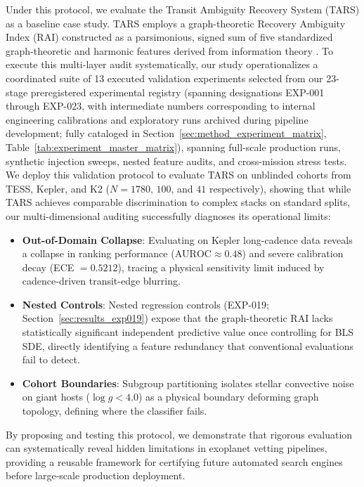 Under this protocol, we evaluate the Transit Ambiguity Recovery System (TARS) as a baseline case study. TARS employs a graph-theoretic Recovery Ambiguity Index (RAI) constructed as a parsimonious, signed sum of five standardized graph-theoretic and harmonic features derived from information theory \citep{Shannon1948, Cover2006}. To execute this multi-layer audit systematically, our study operationalizes a coordinated suite of 13 executed validation experiments selected from our 23-stage preregistered experimental registry (spanning designations EXP-001 through EXP-023, with intermediate numbers corresponding to internal engineering calibrations and exploratory runs archived during pipeline development; fully cataloged in Section~\ref{sec:method_experiment_matrix}, Table~\ref{tab:experiment_master_matrix}), spanning full-scale production runs, synthetic injection sweeps, nested feature audits, and cross-mission stress tests. We deploy this validation protocol to evaluate TARS on unblinded cohorts from TESS, Kepler, and K2 ($N=1780$, $100$, and $41$ respectively), showing that while TARS achieves comparable discrimination to complex stacks on standard splits, our multi-dimensional auditing successfully diagnoses its operational limits:
\begin{itemize}
    \item \textbf{Out-of-Domain Collapse}: Evaluating on Kepler long-cadence data reveals a collapse in ranking performance ($\text{AUROC} \approx 0.48$) and severe calibration decay (ECE $= 0.5212$), tracing a physical sensitivity limit induced by cadence-driven transit-edge blurring.
    \item \textbf{Nested Controls}: Nested regression controls (EXP-019; Section~\ref{sec:results_exp019}) expose that the graph-theoretic RAI lacks statistically significant independent predictive value once controlling for BLS SDE, directly identifying a feature redundancy that conventional evaluations fail to detect.
    \item \textbf{Cohort Boundaries}: Subgroup partitioning isolates stellar convective noise on giant hosts ($\log g < 4.0$) as a physical boundary deforming graph topology, defining where the classifier fails.
\end{itemize}

By proposing and testing this protocol, we demonstrate that rigorous evaluation can systematically reveal hidden limitations in exoplanet vetting pipelines, providing a reusable framework for certifying future automated search engines before large-scale production deployment.
